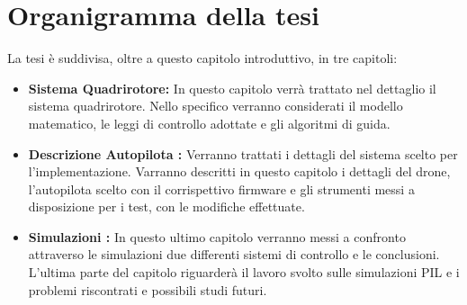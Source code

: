\section{Organigramma della tesi}
La tesi è suddivisa, oltre a questo capitolo introduttivo, in tre capitoli:
\begin{itemize}
	\item \textbf{Sistema Quadrirotore:} In questo capitolo verrà trattato nel dettaglio il sistema quadrirotore. Nello specifico verranno considerati il modello matematico, le leggi di controllo adottate e gli algoritmi di guida.
	\item \textbf{Descrizione Autopilota :} Verranno trattati i dettagli del sistema scelto per l'implementazione. Varranno descritti in questo capitolo i dettagli del drone, l'autopilota scelto con il corrispettivo firmware e gli strumenti messi a disposizione per i test, con le modifiche effettuate.
	\item \textbf{Simulazioni : } In questo ultimo capitolo verranno messi a confronto attraverso le simulazioni due differenti sistemi di controllo e le conclusioni. L'ultima parte del capitolo riguarderà il lavoro svolto sulle simulazioni PIL e i problemi riscontrati e possibili studi futuri.
\end{itemize}